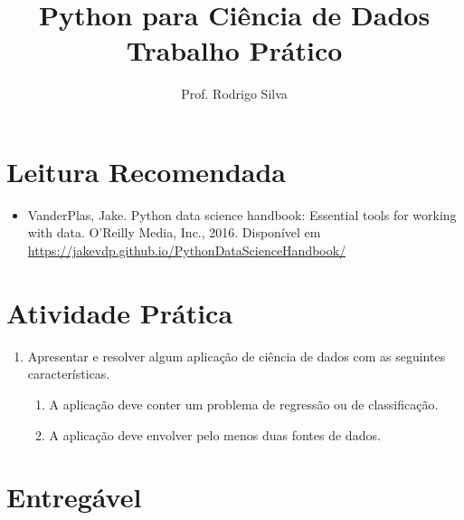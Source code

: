 \documentclass{article}
\title{\vspace{-2 cm}Python para Ciência de Dados \\ Trabalho Prático}
\author{Prof. Rodrigo Silva}
\date{}
\begin{document}
\maketitle



\section{Leitura Recomendada }

\begin{itemize}
    \item VanderPlas, Jake. Python data science handbook: Essential tools for working with data. O'Reilly Media, Inc., 2016. Disponível em \url{https://jakevdp.github.io/PythonDataScienceHandbook/}
\end{itemize}


\section{Atividade Prática}

\begin{enumerate}
    \item  Apresentar e resolver algum aplicação de ciência de dados com as seguintes características.
    \begin{enumerate}
        \item A aplicação deve conter um problema de regressão ou de classificação.
        \item A aplicação deve envolver pelo menos duas fontes de dados.
    \end{enumerate}
\end{enumerate}

\section{Entregável}
\end{document}
